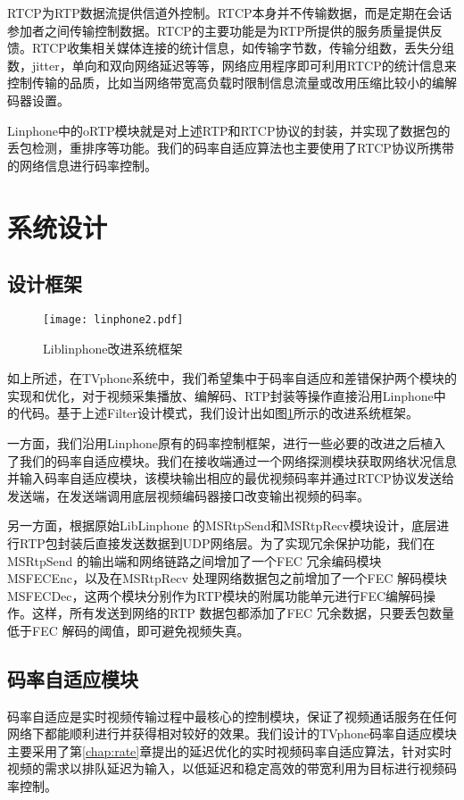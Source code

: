    RTCP为RTP数据流提供信道外控制。RTCP本身并不传输数据，而是定期在会话参加者之间传输控制数据。RTCP的主要功能是为RTP所提供的服务质量提供反馈。RTCP收集相关媒体连接的统计信息，如传输字节数，传输分组数，丢失分组数，jitter，单向和双向网络延迟等等，网络应用程序即可利用RTCP的统计信息来控制传输的品质，比如当网络带宽高负载时限制信息流量或改用压缩比较小的编解码器设置。

    Linphone中的oRTP模块就是对上述RTP和RTCP协议的封装，并实现了数据包的丢包检测，重排序等功能。我们的码率自适应算法也主要使用了RTCP协议所携带的网络信息进行码率控制。

\section{系统设计}


\subsection{设计框架}

\begin{figure}[htbp]
  \centering
  \texttt{[image: linphone2.pdf]}
  \caption{Liblinphone改进系统框架}
  \label{fig:linphone2}
\end{figure}

如上所述，在TVphone系统中，我们希望集中于码率自适应和差错保护两个模块的实现和优化，对于视频采集播放、编解码、RTP封装等操作直接沿用Linphone中的代码。基于上述Filter设计模式，我们设计出如图\ref{fig:linphone2}所示的改进系统框架。

一方面，我们沿用Linphone原有的码率控制框架，进行一些必要的改进之后植入了我们的码率自适应模块。我们在接收端通过一个网络探测模块获取网络状况信息并输入码率自适应模块，该模块输出相应的最优视频码率并通过RTCP协议发送给发送端，在发送端调用底层视频编码器接口改变输出视频的码率。

另一方面，根据原始LibLinphone 的MSRtpSend和MSRtpRecv模块设计，底层进行RTP包封装后直接发送数据到UDP网络层。为了实现冗余保护功能，我们在MSRtpSend 的输出端和网络链路之间增加了一个FEC 冗余编码模块 MSFECEnc，以及在MSRtpRecv 处理网络数据包之前增加了一个FEC 解码模块 MSFECDec，这两个模块分别作为RTP模块的附属功能单元进行FEC编解码操作。这样，所有发送到网络的RTP 数据包都添加了FEC 冗余数据，只要丢包数量低于FEC 解码的阈值，即可避免视频失真。


\subsection{码率自适应模块}
码率自适应是实时视频传输过程中最核心的控制模块，保证了视频通话服务在任何网络下都能顺利进行并获得相对较好的效果。我们设计的TVphone码率自适应模块主要采用了第\ref{chap:rate}章提出的延迟优化的实时视频码率自适应算法，针对实时视频的需求以排队延迟为输入，以低延迟和稳定高效的带宽利用为目标进行视频码率控制。


